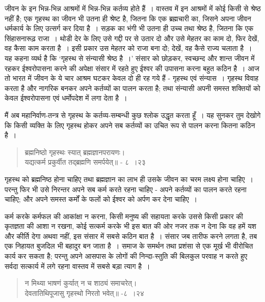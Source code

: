 जीवन के इन भिन्न-भिन्न आश्रमों में भिन्न-भिन्न कर्तव्य होते हैं~। वास्तव में इन आश्रमों में कोई किसी से श्रेष्ठ नहीं है; एक गृहस्थ का जीवन भी उतना ही श्रेष्ट है, जितना कि एक ब्रह्मचारी का, जिसने अपना जीवन धर्मकार्य के लिए उत्सर्ग कर दिया है~। सड़क का भंगी भी उतना ही उच्च तथा श्रेष्ठ है, जितना कि एक सिंहासनारूढ़ राजा~। थोडी देर के लिए उसे गद्दी पर से उतार दो और उसे मेहतर का काम दो, फिर देखें, वह कैसा काम करता है~। इसी प्रकार उस मेहतर को राजा बना दो; देखें, वह कैसे राज्य चलाता है~। यह कहना व्यर्थ है कि ‘गृहस्थ से संन्यासी श्रेष्ठ है~।’ संसार को छोड़कर, स्वच्छन्द और शान्त जीवन में रहकर ईश्वरोपासना करने की अपेक्षा संसार में रहते हुए ईश्वर की उपासना करना बहुत कठिन है~। आज तो भारत में जीवन के ये चार आश्रम घटकर केवल दो ही रह गये हैं - गृहस्थ एवं संन्यास~। गृहस्थ विवाह करता है और नागरिक बनकर अपने कर्तव्यों का पालन करता है; तथा संन्यासी अपनी समस्त शक्तियों को केवल ईश्वरोपासना एवं धर्मोपदेश में लगा देता है~।

मैं अब महानिर्वाण-तन्त्र से गृहस्थ के कर्तव्य-सम्बन्धी कुछ श्लोक उद्धृत करता हूँ~। यह सुनकर तुम देखोगे कि किसी व्यक्ति के लिए गृहस्थ होकर अपने सब कर्तव्यों का उचित रूप से पालन करना कितना कठिन है~।

\begin{verse}
ब्रह्मनिष्ठो गृहस्थः स्यात् ब्रह्मज्ञानपरायणः।\\ यद्यत्कर्म प्रकुर्वीत तद्ब्रह्मणि समर्पयेत्॥ - ८~।२३
\end{verse}

\newpage

गृहस्थ को ब्रह्मनिष्ठ होना चाहिए तथा ब्रह्मज्ञान का लाभ ही उसके जीवन का चरम लक्ष्य होना चाहिए~। परन्तु फिर भी उसे निरन्तर अपने सब कर्म करते रहना चाहिए - अपने कर्तव्यों का पालन करते रहना चाहिए; और अपने समस्त कर्मों के फलों को ईश्वर को अर्पण कर देना चाहिए~।

कर्म करके कर्मफल की आकांक्षा न करना, किसी मनुष्य की सहायता करके उससे किसी प्रकार की कृतज्ञता की आशा न रखना, कोई सत्कर्म करके भी इस बात की ओर नजर तक न देना कि वह हमें यश और कीर्ति देगा अथवा नहीं, इस संसार में सबसे कठिन बात है~। संसार जब तारीफ करने लगता है, तब एक निहायत बुजदिल भी बहादुर बन जाता है~। समाज के समर्थन तथा प्रशंसा से एक मूर्ख भी वीरोचित कार्य कर सकता है; परन्तु अपने आसपास के लोगों की निन्दा-स्तुति की बिलकुल परवाह न करते हुए सर्वदा सत्कार्य में लगे रहना वास्तव में सबसे बड़ा त्याग है~।

\begin{verse}
न मिथ्या भाषणं कुर्यात् न च शाठ्यं समाचरेत्।\\ देवतातिथिपूजासु गृहस्थो निरतो भवेत्॥ -८~।२४
\end{verse}

